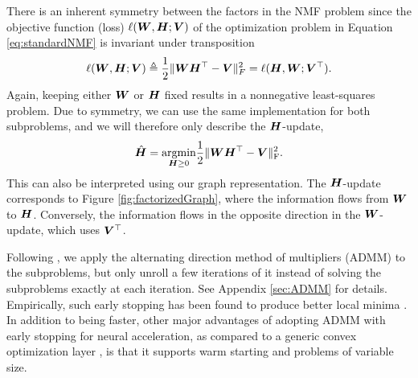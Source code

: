\documentclass{article}
\begin{document}
There is an inherent symmetry between the factors in the NMF problem since the objective function (loss) $\ell({\bm{W}}, {\bm{H}}; {\bm{V}})$ of the optimization problem in Equation \ref{eq:standardNMF} is invariant under transposition 
\begin{equation}
\ell({\bm{W}}, {\bm{H}}; {\bm{V}}) \triangleq \frac{1}{2}\|{\bm{W}}{\bm{H}}^\top   - {\bm{V}}\|_F^2 = \ell({\bm{H}}, {\bm{W}}; {\bm{V}}^\top  ).
\end{equation}
Again, keeping either ${\bm{W}}$ or ${\bm{H}}$ fixed results in a nonnegative least-squares problem. Due to symmetry, we can use the same implementation for both subproblems, and we will therefore only describe the ${\bm{H}}$-update,
\begin{equation}
    \hat{{\bm{H}}} = \underset{{\bm{H}}\geq 0}{\text{argmin}} \frac{1}{2}\|{\bm{W}}{\bm{H}}^\top   - {\bm{V}}\|_\text{F}^2.\label{eq:subproblem}
\end{equation}
This can also be interpreted using our graph representation. The ${\bm{H}}$-update corresponds to Figure \ref{fig:factorizedGraph}, where the information flows from ${\bm{W}}$ to ${\bm{H}}$. Conversely, the information flows in the opposite direction in the ${\bm{W}}$-update, which uses ${\bm{V}}^\top  $.


Following \citet{Huang2016}, we apply the alternating direction method of multipliers (ADMM) \citep{Boyd2011} to the subproblems, but only unroll a few iterations of it instead of solving the subproblems exactly at each iteration. See Appendix \ref{sec:ADMM} for details. Empirically, such early stopping has been found to produce better local minima \citep{Udell2016}. In addition to being faster, other major advantages of adopting ADMM with early stopping for neural acceleration, as compared to a generic convex optimization layer \citep{Agrawal2019}, is that it supports warm starting and problems of variable size. 
\end{document}
